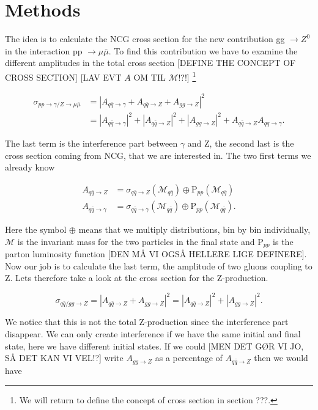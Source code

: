 \section{Methods}
The idea is to calculate the NCG cross section for the new contribution gg $\rightarrow Z^0$ in the interaction pp $\rightarrow \mu \bar \mu$. To find this contribution we have to examine the different amplitudes in the total cross section [DEFINE THE CONCEPT OF CROSS SECTION] [LAV EVT $A$ OM TIL $\mathcal{M}$!?!] \footnote{We will return to define the concept of cross section in section ???.}

\begin{align}
\sigma_{pp \rightarrow \gamma/ Z \rightarrow \mu \bar \mu} &= |A_{q \bar q \rightarrow \gamma} + A_{q \bar q \rightarrow Z} + A_{gg \rightarrow Z}|^{2} \nonumber \\
&= |A_{q \bar q \rightarrow \gamma}|^{2} + |A_{q \bar q \rightarrow Z}|^ {2} + |A_{gg \rightarrow Z}|^{2} + A_{q \bar q \rightarrow Z }A_{qq \rightarrow \gamma}.
\end{align}

The last term is the interference part between $\gamma$ and Z, the second last is the cross section coming from NCG, that we are interested in. The two first terms we already know

\begin{align}
A_{q \bar q \rightarrow Z} &= \sigma_{q \bar q \rightarrow Z} (\mathcal{M}_{q \bar q}) \oplus \textrm{P}_{pp}(\mathcal{M}_{q \bar q}) \nonumber \\ 
A_{q \bar q \rightarrow \gamma} &= \sigma_{q \bar q \rightarrow  \gamma}( \mathcal{M}_{q \bar q}) \oplus \textrm{P}_{pp}(\mathcal{M}_{q \bar q}).
\end{align}

Here the symbol $\oplus$ means that we multiply distributions, bin by bin individually, $\mathcal{M}$ is the invariant mass for the two particles in the final state and P$_{pp}$ is the parton luminosity function [DEN MÅ VI OGSÅ HELLERE LIGE DEFINERE]. Now our job is to calculate the last term, the amplitude of two gluons coupling to Z. Lets therefore take a look at the cross section for the Z-production.

\begin{equation}
\sigma_{q \bar q/gg \rightarrow Z} = |A_{q \bar q \rightarrow Z} + A_{gg \rightarrow Z}|^{2}=|A_{q \bar q \rightarrow Z}|^{2}+|A_{gg \rightarrow Z}|^{2}.
\end{equation}

We notice that this is not the total Z-production since the interference part disappear. We can only create interference if we have the same initial and final state, here we have different initial states. If we could [MEN DET GØR VI JO, SÅ DET KAN VI VEL!?] write $A_{gg \rightarrow Z}$ as a percentage of $A_{q \bar q \rightarrow Z}$ then we would have

